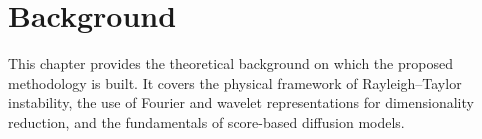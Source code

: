 
\chapter{Background}
\label{chap:background}

This chapter provides the theoretical background on which the proposed methodology is built. It covers the physical framework of Rayleigh--Taylor instability, the use of Fourier and wavelet representations for dimensionality reduction, and the fundamentals of score-based diffusion models.









